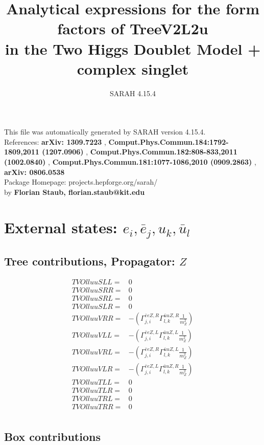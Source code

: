 \documentclass[A4,landscape]{article}
\begin{document}
\title{Analytical expressions for the form factors of TreeV2L2u\\ in the Two Higgs Doublet Model + complex singlet } 
 \author{SARAH 4.15.4} 
 \maketitle 
 \vspace{10cm} 
This file was automatically generated by SARAH version 4.15.4.  \\ 
References: {\bf arXiv: 1309.7223 }, {\bf Comput.Phys.Commun.184:1792-1809,2011 (1207.0906) }, {\bf Comput.Phys.Commun.182:808-833,2011 (1002.0840) }, {\bf Comput.Phys.Commun.181:1077-1086,2010 (0909.2863) }, {\bf arXiv: 0806.0538 } \\ 
Package Homepage: projects.hepforge.org/sarah/ \\ 
by {\bf Florian Staub, florian.staub@kit.edu} 
 \pagebreak 
 \tableofcontents 
 \pagebreak 
\section{External states: ${e_{{i}}, \bar{e}_{{j}}, u_{{k}}, \bar{u}_{{l}}}$} 
\subsection{Tree contributions, Propagator: $Z$} 

\begin{align} 
  TVOlluuSLL= & 0 \\ 
  TVOlluuSRR= & 0 \\ 
  TVOlluuSRL= & 0 \\ 
  TVOlluuSLR= & 0 \\ 
  TVOlluuVRR= & -(\Gamma^{\bar{e}e Z ,R}_{j, i} \Gamma^{\bar{u}u Z ,R}_{l, k} \frac{1}{m^2_{Z}}) \\ 
  TVOlluuVLL= & -(\Gamma^{\bar{e}e Z ,L}_{j, i} \Gamma^{\bar{u}u Z ,L}_{l, k} \frac{1}{m^2_{Z}}) \\ 
  TVOlluuVRL= & -(\Gamma^{\bar{e}e Z ,R}_{j, i} \Gamma^{\bar{u}u Z ,L}_{l, k} \frac{1}{m^2_{Z}}) \\ 
  TVOlluuVLR= & -(\Gamma^{\bar{e}e Z ,L}_{j, i} \Gamma^{\bar{u}u Z ,R}_{l, k} \frac{1}{m^2_{Z}}) \\ 
  TVOlluuTLL= & 0 \\ 
  TVOlluuTLR= & 0 \\ 
  TVOlluuTRL= & 0 \\ 
  TVOlluuTRR= & 0 \\ 
\end{align} 
\subsection{Box contributions} 
\end{document}
